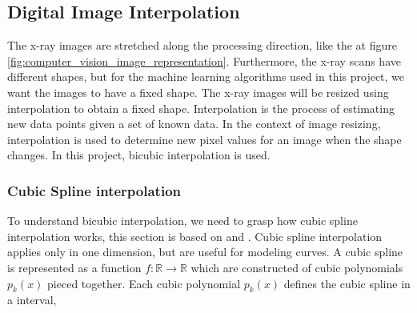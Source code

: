 \documentclass[11pt]{article}
\begin{document}
\subsection{Digital Image Interpolation}\label{sec:computer_vision_digital_image_interpolation}

The x-ray images are stretched along the processing direction, like the at figure \ref{fig:computer_vision_image_representation}. Furthermore, the x-ray scans have different shapes, but for the machine learning algorithms used in this project, we want the images to have a fixed shape. The x-ray images will be resized using interpolation to obtain a fixed shape. Interpolation is the process of estimating new data points given a set of known data. In the context of image resizing, interpolation is used to determine new pixel values for an image when the shape changes. In this project, bicubic interpolation is used.

\subsubsection{Cubic Spline interpolation}\label{sec:computer_vision_cubic_spline}

To understand bicubic interpolation, we need to grasp how cubic spline interpolation works, this section is based on \cite{cubic_spline} and \cite{cubic_spline_2}. Cubic spline interpolation applies only in one dimension, but are useful for modeling curves. A cubic spline is represented as a function $f: \mathbb{R} \rightarrow \mathbb{R}$ which are constructed of cubic polynomials $p_{k}(x)$ pieced together. Each cubic polynomial $p_{k}(x)$ defines the cubic spline in a interval,
\end{document}
